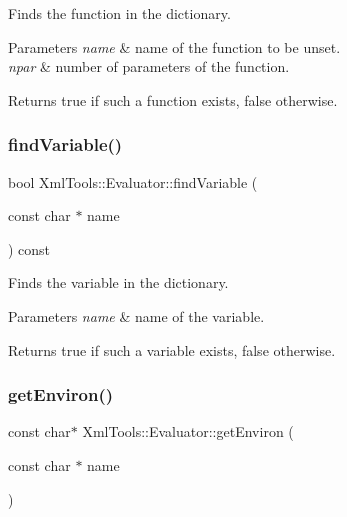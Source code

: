 Finds the function in the dictionary.


\begin{DoxyParams}{Parameters}
{\em name} & name of the function to be unset. \\
\hline
{\em npar} & number of parameters of the function. \\
\hline
\end{DoxyParams}
\begin{DoxyReturn}{Returns}
true if such a function exists, false otherwise. 
\end{DoxyReturn}
\hypertarget{class_xml_tools_1_1_evaluator_a06ef17e645fba30537c84a15c525b4da}{}\label{class_xml_tools_1_1_evaluator_a06ef17e645fba30537c84a15c525b4da} 
\subsubsection{\texorpdfstring{find\+Variable()}{findVariable()}}
{\footnotesize\ttfamily bool Xml\+Tools\+::\+Evaluator\+::find\+Variable (\begin{DoxyParamCaption}\item[{const char $\ast$}]{name }\end{DoxyParamCaption}) const}

Finds the variable in the dictionary.


\begin{DoxyParams}{Parameters}
{\em name} & name of the variable. \\
\hline
\end{DoxyParams}
\begin{DoxyReturn}{Returns}
true if such a variable exists, false otherwise. 
\end{DoxyReturn}
\hypertarget{class_xml_tools_1_1_evaluator_a3b19ba699533cdb3517c3929f9c479ae}{}\label{class_xml_tools_1_1_evaluator_a3b19ba699533cdb3517c3929f9c479ae} 
\subsubsection{\texorpdfstring{get\+Environ()}{getEnviron()}}
{\footnotesize\ttfamily const char$\ast$ Xml\+Tools\+::\+Evaluator\+::get\+Environ (\begin{DoxyParamCaption}\item[{const char $\ast$}]{name }\end{DoxyParamCaption})}

